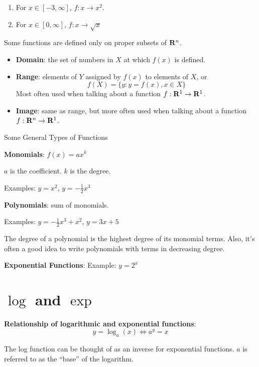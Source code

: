 \documentclass[]{book}
\providecommand{\tightlist}{%
  \setlength{\itemsep}{0pt}\setlength{\parskip}{0pt}}
\theoremstyle{definition}
\theoremstyle{definition}
\theoremstyle{definition}
\theoremstyle{remark}
\begin{document}
\begin{enumerate}
\def\labelenumi{\arabic{enumi}.}
\item
  For \(x \in [-3, \infty]\), \(f: x \rightarrow x^2\).
\item
  For \(x \in [0, \infty]\), \(f: x \rightarrow \sqrt{x}\)
\end{enumerate}

Some functions are defined only on proper subsets of \({\bf R}^n\).

\begin{itemize}
\tightlist
\item
  \textbf{Domain}: the set of numbers in \(X\) at which \(f(x)\) is
  defined.
\item
  \textbf{Range}: elements of \(Y\) assigned by \(f(x)\) to elements of
  \(X\), or \[f(X)=\{ y : y=f(x), x\in X\}\] Most often used when
  talking about a function \(f:{\bf R}^1\to{\bf R}^1\).
\item
  \textbf{Image}: same as range, but more often used when talking about
  a function \(f:{\bf R}^n\to{\bf R}^1\).
\end{itemize}

Some General Types of Functions

\textbf{Monomials}: \(f(x)=a x^k\)

\(a\) is the coefficient. \(k\) is the degree.

Examples: \(y=x^2\), \(y=-\frac{1}{2}x^3\)

\textbf{Polynomials}: sum of monomials.

Examples: \(y=-\frac{1}{2}x^3+x^2\), \(y=3x+5\)

The degree of a polynomial is the highest degree of its monomial terms.
Also, it's often a good idea to write polynomials with terms in
decreasing degree.

\textbf{Exponential Functions}: Example: \(y=2^x\)

\section{\texorpdfstring{\(\log\) and
\(\exp\)}{\textbackslash{}log and \textbackslash{}exp}}\label{logexponents}

\textbf{Relationship of logarithmic and exponential functions}:
\[y=\log_a(x) \iff a^y=x\]

The log function can be thought of as an inverse for exponential
functions. \(a\) is referred to as the ``base'' of the logarithm.
\end{document}

